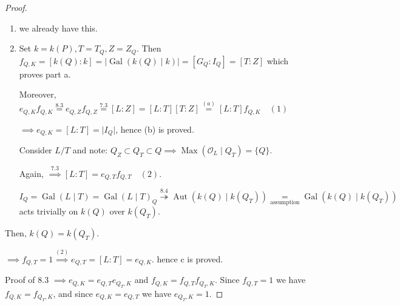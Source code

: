 \documentclass[openany]{amsbook}
\numberwithin{section}{chapter}
\theoremstyle{definition}
\begin{document}
\begin{proof}
    \begin{enumerate}[label=\roman*)]
        \item we already have this. 
        \item Set \(k = k(P), T = T_Q, Z = Z_Q\). Then \(f_{Q,K} = [k(Q):k] = \vert \operatorname{Gal} (k(Q)\mid k) \vert = [G_Q : I_Q] = [T:Z]\) which proves part a.
        
        Moreover, \(e_{Q,K} f_{Q,K} \overset{8.3}{=} e_{Q,Z}f_{Q,Z} \overset{7.3}{=} [L:Z] =[L:T][T:Z] \overset{(a)}{=} [L:T]f_{Q,K} \quad (1)\) 

        \(\implies e_{Q,K} = [L:T] = \vert I_Q \vert\), hence (b) is proved.

        Consider \(L / T\) and note: \(Q_Z \subset Q_T \subset Q \implies \operatorname{Max} (\mathcal{O}_L \mid Q_T) = \{ Q \}\).
        
        Again, \(\overset{7.3}{\implies} [L:T] = e_{Q,T} f_{Q,T} \quad (2)\).

        \(I_Q = \operatorname{Gal} (L \mid T) = \operatorname{Gal} (L \mid T)_Q \overset{8.4}{\twoheadrightarrow} \operatorname{Aut} (k(Q)\mid k(Q_T)) \underset{\text{assumption}}{=}  \operatorname{Gal} (k(Q) \mid k(Q_T))\) acts trivially on \(k(Q)\) over \(k(Q_T)\).

    \end{enumerate} 


        \begin{center}
        \end{center}

        Then, \(k(Q) = k(Q_T)\).

        \(\implies f_{Q,T} = 1 \overset{(2)}{\implies} e_{Q,T} = [L:T] = e_{Q,K}\). hence c is proved. 

        Proof of 8.3 \(\implies e_{Q,K} = e_{Q,T}e_{Q_T,K}\) and \(f_{Q,K} = f_{Q,T} f_{Q_T,K}\). Since \(f_{Q,T}=1\) we have \(f_{Q,K} = f_{Q_T,K}\), and since \(e_{Q,K} = e_{Q,T}\) we have \(e_{Q_T,K}=1\). 

\end{proof}
\end{document}
